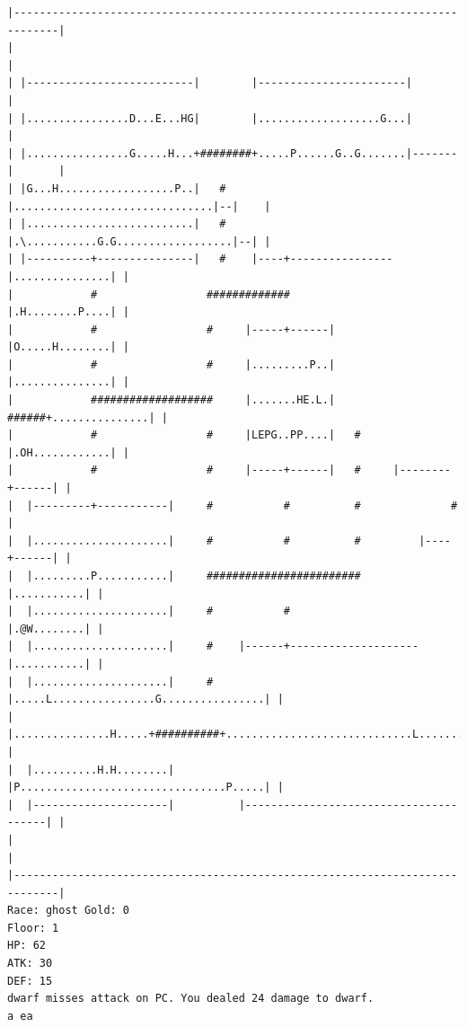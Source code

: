 \documentclass[11pt]{article}
\theoremstyle{plain}
\begin{document}
\begin{Verbatim}[fontsize=\scriptsize]
|-----------------------------------------------------------------------------|
|                                                                             |
| |--------------------------|        |-----------------------|               |
| |................D...E...HG|        |...................G...|               |
| |................G.....H...+########+.....P......G..G.......|-------|       |
| |G...H..................P..|   #    |...............................|--|    |
| |..........................|   #    |.\...........G.G..................|--| |
| |----------+---------------|   #    |----+----------------|...............| |
|            #                 #############                |.H........P....| |
|            #                 #     |-----+------|         |O.....H........| |
|            #                 #     |.........P..|         |...............| |
|            ###################     |.......HE.L.|   ######+...............| |
|            #                 #     |LEPG..PP....|   #     |.OH............| |
|            #                 #     |-----+------|   #     |--------+------| |
|  |---------+-----------|     #           #          #              #        |
|  |.....................|     #           #          #         |----+------| |
|  |.........P...........|     ########################         |...........| |
|  |.....................|     #           #                    |.@W........| |
|  |.....................|     #    |------+--------------------|...........| |
|  |.....................|     #    |.....L................G................| |
|  |...............H.....+##########+.............................L.........| |
|  |..........H.H........|          |P................................P.....| |
|  |---------------------|          |---------------------------------------| |
|                                                                             |
|-----------------------------------------------------------------------------|
Race: ghost Gold: 0                                                    Floor: 1
HP: 62
ATK: 30
DEF: 15
dwarf misses attack on PC. You dealed 24 damage to dwarf. 
a ea


\end{Verbatim}
\end{document}
